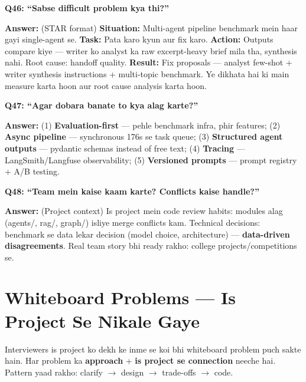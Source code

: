 \begin{interviewbox}
\textbf{Q46: ``Sabse difficult problem kya thi?''}

\textbf{Answer:} (STAR format) \textbf{Situation:} Multi-agent pipeline benchmark mein haar gayi single-agent se. \textbf{Task:} Pata karo kyun aur fix karo. \textbf{Action:} Outputs compare kiye --- writer ko analyst ka raw excerpt-heavy brief mila tha, synthesis nahi. Root cause: handoff quality. \textbf{Result:} Fix proposals --- analyst few-shot + writer synthesis instructions + multi-topic benchmark. Ye dikhata hai ki main measure karta hoon aur root cause analysis karta hoon.
\end{interviewbox}

\begin{interviewbox}
\textbf{Q47: ``Agar dobara banate to kya alag karte?''}

\textbf{Answer:} (1) \textbf{Evaluation-first} --- pehle benchmark infra, phir features; (2) \textbf{Async pipeline} --- synchronous 176s se task queue; (3) \textbf{Structured agent outputs} --- pydantic schemas instead of free text; (4) \textbf{Tracing} --- LangSmith/Langfuse observability; (5) \textbf{Versioned prompts} --- prompt registry + A/B testing.
\end{interviewbox}

\begin{interviewbox}
\textbf{Q48: ``Team mein kaise kaam karte? Conflicts kaise handle?''}

\textbf{Answer:} (Project context) Is project mein code review habits: modules alag (agents/, rag/, graph/) isliye merge conflicts kam. Technical decisions: benchmark se data lekar decision (model choice, architecture) --- \textbf{data-driven disagreements}. Real team story bhi ready rakho: college projects/competitions se.
\end{interviewbox}

\section{Whiteboard Problems --- Is Project Se Nikale Gaye}

\begin{storybox}
Interviewers is project ko dekh ke inme se koi bhi whiteboard problem puch sakte hain. Har problem ka \textbf{approach} + \textbf{is project se connection} neeche hai. Pattern yaad rakho: clarify $\rightarrow$ design $\rightarrow$ trade-offs $\rightarrow$ code.
\end{storybox}

